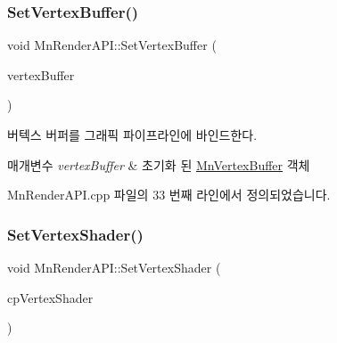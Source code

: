 \mbox{\label{class_m_n_l_1_1_mn_render_a_p_i_a4bcf2ac2d71b25663956493f2cd6c613}} 
\subsubsection{\texorpdfstring{Set\+Vertex\+Buffer()}{SetVertexBuffer()}\hspace{0.1cm}{\footnotesize\ttfamily [2/2]}}
{\footnotesize\ttfamily void Mn\+Render\+A\+P\+I\+::\+Set\+Vertex\+Buffer (\begin{DoxyParamCaption}\item[{const \hyperlink{class_m_n_l_1_1_mn_vertex_buffer}{Mn\+Vertex\+Buffer} \&}]{vertex\+Buffer }\end{DoxyParamCaption})}



버텍스 버퍼를 그래픽 파이프라인에 바인드한다. 


\begin{DoxyParams}{매개변수}
{\em vertex\+Buffer} & 초기화 된 \hyperlink{class_m_n_l_1_1_mn_vertex_buffer}{Mn\+Vertex\+Buffer} 객체 \\
\hline
\end{DoxyParams}


Mn\+Render\+A\+P\+I.\+cpp 파일의 33 번째 라인에서 정의되었습니다.

\mbox{\label{class_m_n_l_1_1_mn_render_a_p_i_a14436db58cba8d81570cb77f46f6e240}} 
\subsubsection{\texorpdfstring{Set\+Vertex\+Shader()}{SetVertexShader()}}
{\footnotesize\ttfamily void Mn\+Render\+A\+P\+I\+::\+Set\+Vertex\+Shader (\begin{DoxyParamCaption}\item[{const \hyperlink{namespace_m_n_l_a8036d713226061c4827b537821fbf79b}{C\+P\+D3\+D\+Vertex\+Shader} \&}]{cp\+Vertex\+Shader }\end{DoxyParamCaption})}



